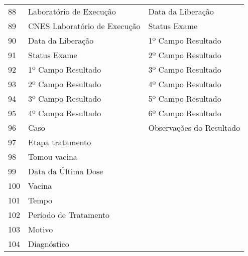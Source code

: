 \begin{table}
\begin{tabular}{lll}
88                                   & Laboratório de Execução          & Data da Liberação                 \\
89                                   & CNES Laboratório de Execução     & Status Exame                      \\
90                                   & Data da Liberação                & 1º Campo Resultado                \\
91                                   & Status Exame                     & 2º Campo Resultado                \\
92                                   & 1º Campo Resultado               & 3º Campo Resultado                \\
93                                   & 2º Campo Resultado               & 4º Campo Resultado                \\
94                                   & 3º Campo Resultado               & 5º Campo Resultado                \\
95                                   & 4º Campo Resultado               & 6º Campo Resultado                \\
96                                   & Caso                             & Observações do Resultado          \\
97                                   & Etapa tratamento                 &                                   \\
98                                   & Tomou vacina                     &                                   \\
99                                   & Data da Última Dose              &                                   \\
100                                  & Vacina                           &                                   \\
101                                  & Tempo                            &                                   \\
102                                  & Período de Tratamento            &                                   \\
103                                  & Motivo                           &                                   \\
104                                  & Diagnóstico                      &                                   \\
\end{tabular}
\end{table}

